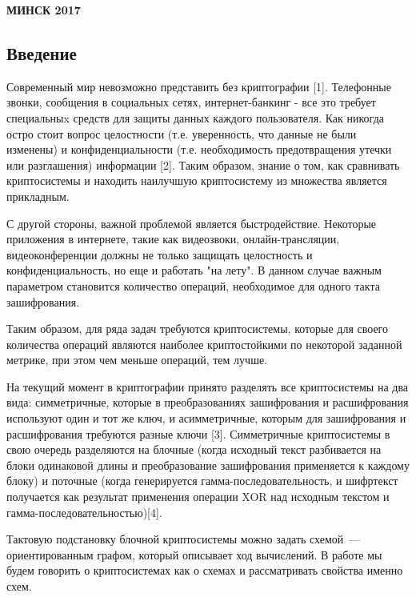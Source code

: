 \documentclass[a4paper,12pt]{extarticle}
\theoremstyle{plain} %
\begin{document}

\begin{center}
\bf{МИНСК 2017}
\end{center}
\begin{large}
\newpage
\tableofcontents
 
\clearpage

\newpage
\section*{Введение}
\vspace*{1cm}

Современный мир невозможно представить без криптографии [1]. Телефонные звонки, сообщения в социальных сетях, интернет-банкинг - все это требует специальныx средств для защиты данных каждого пользователя. Как никогда остро стоит вопрос целостности (т.е. уверенность, что данные не были изменены) и конфиденциальности (т.е. необходимость предотвращения утечки или разглашения) информации [2]. Таким образом, знание о том, как сравнивать криптосистемы и находить наилучшую криптосистему из множества является прикладным.

С другой стороны, важной проблемой является быстродействие. Некоторые приложения в интернете, такие как видеозвоки, онлайн-трансляции, видеоконференции должны не только защищать целостность и конфиденциальность, но еще и работать "на лету". В данном случае важным параметром становится количество операций, необходимое для одного такта зашифрования.

Таким образом, для ряда задач требуются криптосистемы, которые для своего количества операций являются наиболее криптостойкими по некоторой заданной метрике, при этом чем меньше операций, тем лучше.

На текущий момент в криптографии принято разделять все криптосистемы на два вида: симметричные, которые в преобразованиях зашифрования и расшифрования используют один и тот же ключ, и асимметричные, которым для зашифрования и расшифрования требуются разные ключи [3]. Симметричные криптосистемы в свою очередь разделяются на блочные (когда исходный текст разбивается на блоки одинаковой длины и преобразование зашифрования применяется к каждому блоку) и поточные (когда генерируется гамма-последовательность, и шифртекст получается как результат применения операции XOR над исходным текстом и гамма-последовательностью)[4]. 

Тактовую подстановку блочной криптосистемы можно задать схемой~---
ориентированным графом, который описывает ход вычислений. В работе мы будем говорить о криптосистемах как о схемах и рассматривать свойства именно схем.


\end{large}
\end{document}
